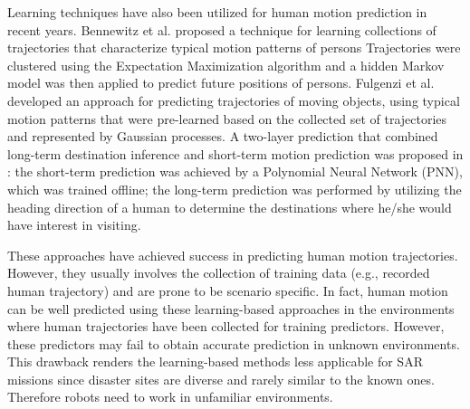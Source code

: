 \documentclass[letterpaper, 10 pt, conference]{ieeeconf}
\newcommand{\todohere}[1]{\hl{(\textbf{TODO:} #1)}}
\begin{document}
	Learning techniques have also been utilized for human motion prediction in recent years. 
	Bennewitz et al. \cite{bennewitz2005learning} proposed a technique for learning collections of trajectories that characterize typical motion patterns of persons
	Trajectories were clustered using the Expectation Maximization algorithm and a hidden Markov model was then applied to predict future positions of persons.
	Fulgenzi et al. \cite{fulgenzi2008probabilistic} developed an approach for predicting trajectories of moving objects, using typical motion patterns that were pre-learned based on the collected set of trajectories and represented by Gaussian processes.
	A two-layer prediction that combined long-term destination inference and short-term motion prediction was proposed in \cite{foka2010probabilistic}:
	the short-term prediction was achieved by a Polynomial Neural Network (PNN), which was trained offline;
	the long-term prediction was performed by utilizing the heading direction of a human to determine the destinations where he/she would have interest in visiting.
	
	These approaches have achieved success in predicting human motion trajectories.
	However, they usually involves the collection of training data (e.g., recorded human trajectory) and are prone to be scenario specific. 
	In fact, human motion can be well predicted using these learning-based approaches in the environments where human trajectories have been collected for training predictors.
	However, these predictors may fail to obtain accurate prediction in unknown environments.
	This drawback renders the learning-based methods less applicable for SAR missions since disaster sites are diverse and rarely similar to the known ones.
	Therefore robots need to work in unfamiliar environments.
	
\end{document}

